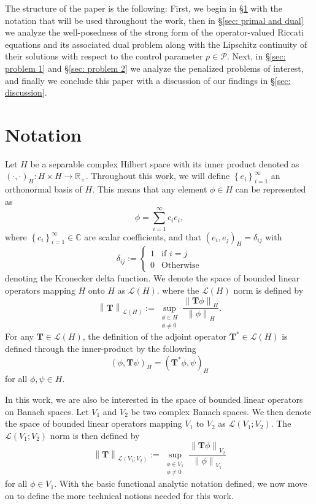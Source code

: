 \documentclass{amsart}
\newcommand{\sL}{\mathscr L}
\newcommand{\p}[1]{\left( {#1} \right)}
\newcommand{\norm}[1]{\left\| #1 \right\|}
\newcommand{\Br}[1]{\left\{ #1 \right\}}
\newcommand{\sP}{\mathcal{P}}
\newcommand{\bT}{\mathbf T}
\begin{document}
The structure of the paper is the following: First, we begin in \S \ref{section: Notation} with the notation that will be used throughout the work, then in \S\ref{sec: primal and dual} we analyze the well-posedness of the strong form of the operator-valued Riccati equations and its associated dual problem along with the Lipschitz continuity of their solutions with respect to the control parameter $p\in\sP$. Next, in \S\ref{sec: problem 1} and \S\ref{sec: problem 2} we analyze the penalized problems of interest, and finally we conclude this paper with a discussion of our findings in \S\ref{sec: discussion}. 

\section{Notation} \label{section: Notation}
Let $H$ be a separable complex Hilbert space with its  inner product denoted as $\p{\cdot,\cdot}_H : H\times H \rightarrow \mathbb R_+$. Throughout this work, we will define $\Br{e_i}_{i=1}^\infty$ an orthonormal basis of $H$. This means that any element $\phi \in H$ can be represented as
$$
    \phi = \sum_{i=1}^\infty c_i e_i,
$$
where $\Br{c_i}_{i=1}^\infty \in \mathbb C$ are scalar coefficients, and that $\p{e_i, e_j}_H = \delta_{ij}$ with 
$$
\delta_{ij} :=\begin{cases}
1 & \textrm{if } i=j \\
0 & \textrm{Otherwise}
\end{cases}
$$ 
denoting the Kronecker delta function. We denote the space of bounded linear operators mapping $H$ onto $H$ as $\sL\p{H}$. where the $\sL\p{H}$ norm is defined by
$$
   \norm{\bT}_{\sL\p{H}} := \sup_{\substack{\phi \in H\\\phi \neq 0}} \frac{\norm{\bT\phi}_H}{\norm{\phi}_H}.
$$
For any $\bT \in \sL\p{H}$, the definition of the adjoint operator $\bT^* \in \sL\p{H}$ is defined through the inner-product by the following
$$
    \p{\phi, \bT\psi}_H = \p{\bT^*\phi, \psi}_H
$$
for all $\phi, \psi \in H$. 

In this work, we are also be interested in the space of bounded linear operators on Banach spaces. Let $V_1$ and $V_2$ be two complex Banach spaces. We then denote the space of bounded linear operators mapping $V_1$ to $V_2$ as $\sL\p{V_1; V_2}$. The $\sL\p{V_1; V_2}$ norm is then defined by
$$
    \norm{\bT}_{\sL\p{V_1;V_2}} := \sup_{\substack{\phi \in V_1\\ \phi \neq 0}} \frac{\norm{\bT \phi}_{V_2}}{\norm{\phi}_{V_1}}
$$
for all $\phi \in V_1$. With the basic functional analytic notation defined, we now move on to define the more technical notions needed for this work.  
\end{document}
